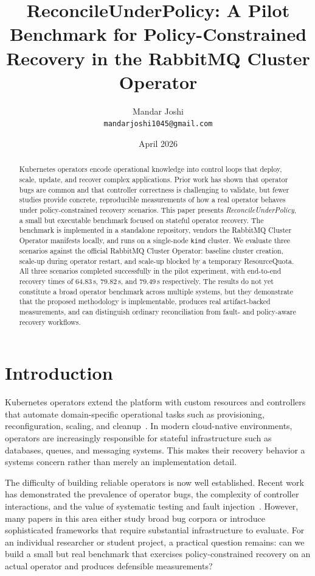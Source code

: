 \documentclass[11pt,a4paper]{article}
\title{\textbf{ReconcileUnderPolicy: A Pilot Benchmark for Policy-Constrained Recovery in the RabbitMQ Cluster Operator}}
\author{Mandar Joshi \\ \texttt{mandarjoshi1045@gmail.com}}
\date{April 2026}
\begin{document}
\maketitle

\begin{abstract}
Kubernetes operators encode operational knowledge into control loops that
deploy, scale, update, and recover complex applications. Prior work has shown
that operator bugs are common and that controller correctness is challenging to
validate, but fewer studies provide concrete, reproducible measurements of how a
real operator behaves under policy-constrained recovery scenarios. This paper
presents \emph{ReconcileUnderPolicy}, a small but executable benchmark focused on
stateful operator recovery. The benchmark is implemented in a standalone
repository, vendors the RabbitMQ Cluster Operator manifests locally, and runs on
a single-node \texttt{kind} cluster. We evaluate three scenarios against the
official RabbitMQ Cluster Operator: baseline cluster creation, scale-up during
operator restart, and scale-up blocked by a temporary ResourceQuota. All three
scenarios completed successfully in the pilot experiment, with end-to-end
recovery times of 64.83\,s, 79.82\,s, and 79.49\,s respectively. The results
do not yet constitute a broad operator benchmark across multiple systems, but
they demonstrate that the proposed methodology is implementable, produces real
artifact-backed measurements, and can distinguish ordinary reconciliation from
fault- and policy-aware recovery workflows.
\end{abstract}

\section{Introduction}

Kubernetes operators extend the platform with custom resources and controllers
that automate domain-specific operational tasks such as provisioning,
reconfiguration, scaling, and cleanup~\cite{k8s-operator}. In modern
cloud-native environments, operators are increasingly responsible for stateful
infrastructure such as databases, queues, and messaging systems. This makes
their recovery behavior a systems concern rather than merely an implementation
detail.

The difficulty of building reliable operators is now well established. Recent
work has demonstrated the prevalence of operator bugs, the complexity of
controller interactions, and the value of systematic testing and fault
injection~\cite{acto,sieve,watchers,issta-bugs}. However, many papers in this
area either study broad bug corpora or introduce sophisticated frameworks that
require substantial infrastructure to evaluate. For an individual researcher or
student project, a practical question remains: can we build a small but real
benchmark that exercises policy-constrained recovery on an actual operator and
produces defensible measurements?
\end{document}
